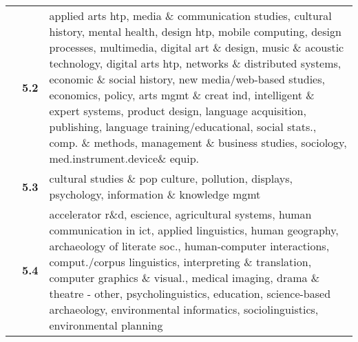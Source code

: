 \begin{spacing}{0.9}
\begin{longtable}[r]{r|r|p{11.5cm}}
& \textbf{5.2} & {applied arts htp, media \& communication studies, cultural history, mental health, design htp, mobile computing, design processes, multimedia, digital art \& design, music \& acoustic technology, digital arts htp, networks \& distributed systems, economic \& social history, new media/web-based studies, economics, policy, arts mgmt \& creat ind, intelligent \& expert systems, product design, language acquisition, publishing, language training/educational, social stats., comp. \& methods, management \& business studies, sociology, med.instrument.device\& equip.}\\
& \textbf{5.3} & {cultural studies \& pop culture, pollution, displays, psychology, information \& knowledge mgmt}\\
& \textbf{5.4} & {accelerator r\&d, escience, agricultural systems, human communication in ict, applied linguistics, human geography, archaeology of literate soc., human-computer interactions, comput./corpus linguistics, interpreting \& translation, computer graphics \& visual., medical imaging, drama \& theatre - other, psycholinguistics, education, science-based archaeology, environmental informatics, sociolinguistics, environmental planning}
\end{longtable}
\end{spacing}

\clearpage

